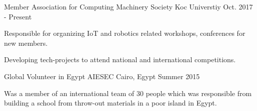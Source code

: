 \begin{cventries}
  \cventry
    {Member} %
    {Association for Computing Machinery Society} %
    {Koc Universtiy} %
    {Oct. 2017 - Present} %
    {
      \begin{cvitems} %
        \item {Responsible for organizing IoT and robotics related workshops, conferences for new members. }
        \item {Developing tech-projects to attend national and international competitions. }
      \end{cvitems}
    }

  \cventry
    {Global Volunteer in Egypt } %
    {AIESEC} %
    {Cairo, Egypt} %
    {Summer 2015} %
    {
      \begin{cvitems} %
        \item {Was a member of an international team of 30 people which was responsible from building a school from throw-out materials in a poor island in Egypt. }
      \end{cvitems}
    }

\end{cventries}
